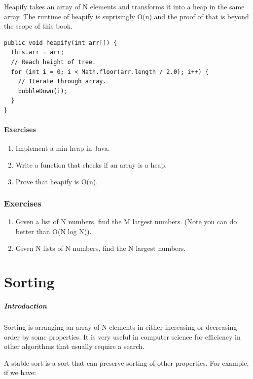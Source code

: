 \documentclass[11pt,oneside]{book}
\begin{document}
Heapify takes an array of N elements and transforms it into a heap in the same array. The runtime of heapify is suprisingly O(n) and the proof of that is beyond the scope of this book.

\begin{lstlisting}
public void heapify(int arr[]) {
  this.arr = arr;
  // Reach height of tree.
  for (int i = 0; i < Math.floor(arr.length / 2.0); i++) {
    // Iterate through array.
    bubbleDown(i);
  }
}
\end{lstlisting}

\subsection{Exercises}

\begin{enumerate}
\item Implement a min heap in Java.
\item Write a function that checks if an array is a heap.
\item Prove that heapify is O(n).
\end{enumerate}

        \section{ Exercises }
        

\begin{enumerate}
\item Given a list of N numbers, find the M largest numbers. (Note you can do better than O(N log N)).
\item Given N lists of N numbers, find the N largest numbers.
\end{enumerate}

\part{ Sorting }
    \subsubsection{ Introduction }
    

Sorting is arranging an array of N elements in either increasing or decreasing order by some properties. It is very useful in computer science for efficiency in other algorithms that usually require a search.

A stable sort is a sort that can preserve sorting of other properties. For example, if we have:
\end{document}
